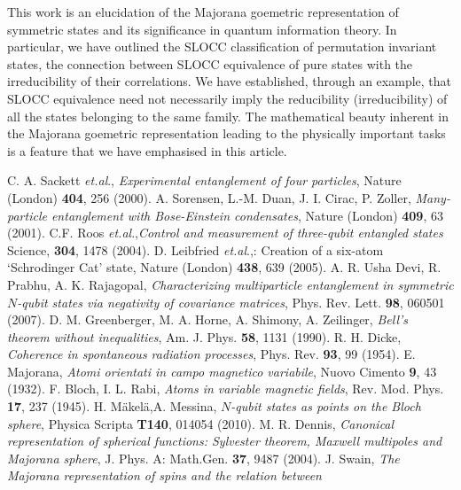 {This work is an elucidation of the Majorana goemetric representation of symmetric states and its significance in quantum information theory. In particular, we have outlined the SLOCC classification of permutation invariant states, the connection between SLOCC equivalence of pure states with the irreducibility \cite{SP1,SP2,SP2b} of their correlations. We have established, through an example, that SLOCC equivalence need not necessarily imply the reducibility (irreducibility) of all the states belonging to the same family. The  mathematical beauty inherent in the Majorana goemetric representation leading to the physically important tasks is a feature that we have emphasised in this article. 


\renewcommand{\bibname}{References}
\begin{thebibliography}{99}
 C. A. Sackett {\it{et.al}}., {\em Experimental entanglement of four particles},  Nature (London) {\bf{404}}, 256 (2000).
 A. Sorensen, L.-M. Duan, J. I. Cirac, P. Zoller, {\em Many-particle entanglement with
Bose-Einstein condensates}, Nature (London) {\bf{409}}, 63 (2001).
C.F. Roos  {\it{et.al}}.,{\em Control and measurement of three-qubit entangled states} Science, {\bf{304}}, 1478 (2004).
 D. Leibfried  {\it{et.al}}.,: Creation of a six-atom `Schrodinger Cat' state, Nature (London) {\bf{438}}, 639 (2005).
 A. R. Usha Devi, R. Prabhu,  A. K. Rajagopal, {\em Characterizing multiparticle entanglement in symmetric $N$-qubit states
via negativity of covariance matrices}, Phys. Rev. Lett. {\bf{98}}, 060501 (2007).  
 D. M. Greenberger, M. A. Horne, A. Shimony, A. Zeilinger, {\em Bell's theorem without inequalities}, Am. J. Phys. {\bf 58}, 1131 (1990).
 R. H. Dicke,  {\em Coherence in spontaneous radiation processes}, Phys. Rev. {\bf 93}, 99 (1954).
 E. Majorana, {\em Atomi orientati in campo magnetico variabile}, Nuovo Cimento {\bf 9}, 43  (1932). 
 F. Bloch, I. L. Rabi, {\em  Atoms in variable magnetic fields}, Rev. Mod. Phys. {\bf 17}, 237 (1945).
  H. M{\"a}kel{\"a},A.  Messina, {\em  $N$-qubit states as points on the
Bloch sphere}, Physica Scripta {\bf T140}, 014054 (2010). 
 M. R. Dennis, {\em  Canonical representation of spherical functions:
Sylvester theorem, Maxwell multipoles and Majorana sphere}, J. Phys. A: Math.Gen. {\bf 37}, 9487 (2004).
 J. Swain, {\em The Majorana representation of spins and the relation between
}
\end{thebibliography}}

